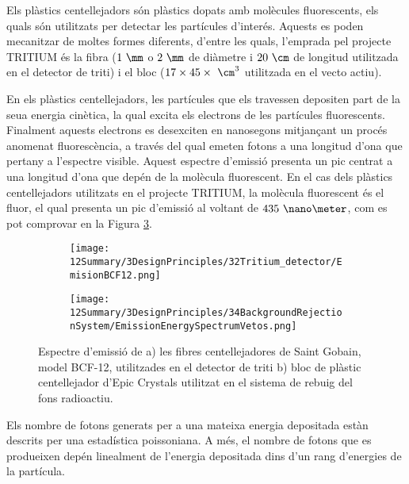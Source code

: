 Els plàstics centellejadors són plàstics dopats amb molècules fluorescents, els quals són utilitzats per detectar les partícules d'interés. Aquests es poden mecanitzar de moltes formes diferents, d'entre les quals, l'emprada pel projecte TRITIUM és la fibra ($1~\mm$ o $2~\mm$ de diàmetre i $20~\cm$ de longitud utilitzada en el detector de triti) i el bloc ($17\times 45 \times~\cm^3$ utilitzada en el vecto actiu). 

En els plàstics centellejadors, les partícules que els travessen depositen part de la seua energia cinètica, la qual excita els electrons de les partícules fluorescents. Finalment aquests electrons es desexciten en nanosegons mitjançant un procés anomenat fluorescència, a través del qual emeten fotons a una longitud d'ona que pertany a l'espectre visible. Aquest espectre d'emissió presenta un pic centrat a una longitud d'ona que depén de la molècula fluorescent. En el cas dels plàstics centellejadors utilitzats en el projecte TRITIUM, la molècula fluorescent és el fluor, el qual presenta un pic d'emissió al voltant de $435~\nano\meter$, com es pot comprovar en la Figura \ref{fig:EspectreEmisioPlasticsTRITIUM}.
\begin{figure}
\centering
    \begin{subfigure}[b]{0.7\textwidth}
    \centering
    \texttt{[image: 12Summary/3DesignPrinciples/32Tritium\_detector/EmisionBCF12.png]}  
        \caption{}\label{subfig:EspectreEmisioFibres}
    \end{subfigure}
    \hfill
    \begin{subfigure}[b]{0.7\textwidth}
    \centering
    \texttt{[image: 12Summary/3DesignPrinciples/34BackgroundRejectionSystem/EmissionEnergySpectrumVetos.png]}  
    \caption{\label{subfig:EspectreEmisioVeto}}
    \end{subfigure}
\caption{Espectre d'emissió de a) les fibres centellejadores de Saint Gobain, model BCF-12, utilitzades en el detector de triti \cite{DataSheetBCF12Fiber} b) bloc de plàstic centellejador d'Epic Crystals utilitzat en el sistema de rebuig del fons radioactiu\cite{ScintillatorVeto}\label{fig:EspectreEmisioPlasticsTRITIUM}.}
\end{figure}
Els nombre de fotons generats per a una mateixa energia depositada estàn descrits per una estadística poissoniana. A més, el nombre de fotons que es produeixen depén linealment de l'energia depositada dins d'un rang d'energies de la partícula.

